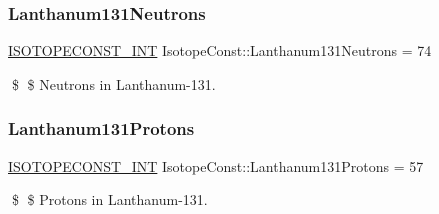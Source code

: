 \subsubsection{\texorpdfstring{Lanthanum131\+Neutrons}{Lanthanum131Neutrons}}
{\footnotesize\ttfamily \mbox{\hyperlink{group___isotope_const-_macros_ga5f18360b3e99483a35c32d789e62621c}{I\+S\+O\+T\+O\+P\+E\+C\+O\+N\+S\+T\+\_\+\+I\+NT}} Isotope\+Const\+::\+Lanthanum131\+Neutrons = 74}

\$ \$ Neutrons in Lanthanum-\/131. \mbox{\label{group___isotope_const-_lanthanum-_la131_ga4e482ac197a810f50d8d1382e83509f2}} 
\subsubsection{\texorpdfstring{Lanthanum131\+Protons}{Lanthanum131Protons}}
{\footnotesize\ttfamily \mbox{\hyperlink{group___isotope_const-_macros_ga5f18360b3e99483a35c32d789e62621c}{I\+S\+O\+T\+O\+P\+E\+C\+O\+N\+S\+T\+\_\+\+I\+NT}} Isotope\+Const\+::\+Lanthanum131\+Protons = 57}

\$ \$ Protons in Lanthanum-\/131. 